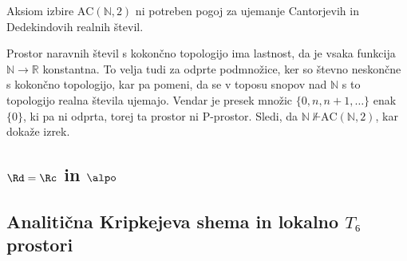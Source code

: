 \begin{izrek}
  Aksiom izbire \(\mathrm{AC}(ℕ,2)\) ni potreben pogoj za ujemanje Cantorjevih
  in Dedekindovih realnih števil.
\end{izrek}
\begin{dokaz}
  Prostor naravnih števil s kokončno topologijo ima lastnost, da je vsaka
  funkcija \(ℕ → ℝ\) konstantna. To velja tudi za odprte podmnožice, ker so
  števno neskončne s kokončno topologijo, kar pa pomeni, da se v toposu snopov
  nad \(ℕ\) s to topologijo realna števila ujemajo. Vendar je presek množic
  \(\{0, n, n+1, …\} \) enak \(\{0\}\), ki pa ni odprta, torej ta prostor ni
  P-prostor. Sledi, da \(ℕ~\not⊩ \mathrm{AC}(ℕ, 2)\), kar dokaže izrek.
\end{dokaz}


\subsection{\(\Rd = \Rc\) in \(\alpo\)}
\subsection{Analitična Kripkejeva shema in lokalno \(T₆\) prostori}


